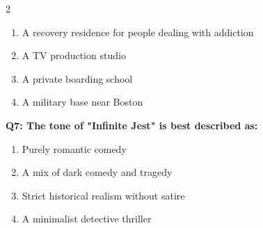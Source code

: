 \documentclass[10pt]{article}
\begin{document}
\begin{multicols}{2}
\begin{enumerate}[label=\arabic*.]
\item A recovery residence for people dealing with addiction
\item A TV production studio
\item A private boarding school
\item A military base near Boston
\end{enumerate}
\textbf{Q7: The tone of "Infinite Jest" is best described as:}

\begin{enumerate}[label=\arabic*.]
\item Purely romantic comedy
\item A mix of dark comedy and tragedy
\item Strict historical realism without satire
\item A minimalist detective thriller
\end{enumerate}
\end{multicols}

\newpage
\end{document}

